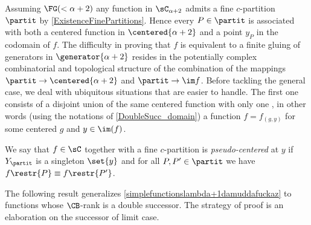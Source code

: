 Assuming $\FG(<\alpha+2)$ any function in $\sC_{\alpha+2}$ admits a fine $c$-partition $\partit$ by \cref{ExistenceFinePartitions}.
Hence every $P\in \partit$ is associated with both a centered function in $\centered{\alpha+2}$ and a point $y_P$ in the codomain of $f$.
{The difficulty in proving that $f$ is equivalent to a finite gluing of generators in $\generator{\alpha+2}$
resides in the potentially complex combinatorial and topological structure of the combination of the mappings $\partit\to \centered{\alpha+2}$ and $\partit\to \im f$. }
Before tackling the general case, we deal with ubiquitous situations that are easier to handle.
The first one consists of a disjoint union of the same centered function with only one \cocenter{},
in other words (using the notations of \cref{DoubleSucc_domain}) a function $f=f_{(g,y)}$ for some centered $g$ and $y\in\im(f)$.

\begin{definition}
We say that $f\in\sC$ together with a fine $c$-partition is \emph{pseudo-centered} at $y$ if $Y_\partit$ is a singleton $\set{y}$ and for all $P,P'\in \partit$ we have $f\restr{P}\equiv f\restr{P'}$.
\end{definition}

The following result generalizes \cref{simplefunctionslambda+1damuddafuckaz} to functions whose $\CB$-rank is a double successor.
The strategy of proof is an elaboration on the successor of limit case.

